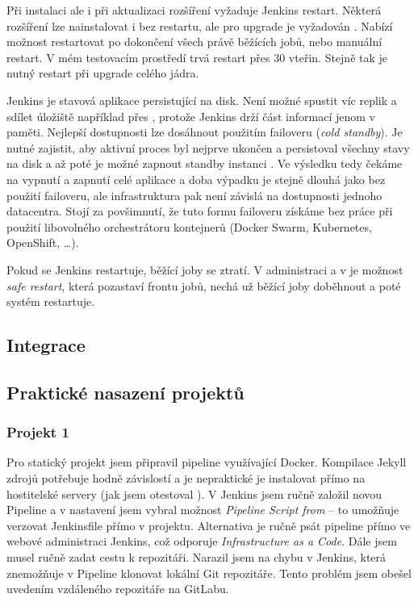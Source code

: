         Při instalaci ale i při aktualizaci rozšíření vyžaduje Jenkins restart. Některá rozšíření lze nainstalovat i bez restartu, ale pro upgrade je vyžadován \cite{jenkins-norestart}. Nabízí možnost restartovat po dokončení všech právě běžících jobů, nebo manuální restart. V mém testovacím prostředí trvá restart přes 30 vteřin. Stejně tak je nutný restart při upgrade celého jádra.

        Jenkins je stavová aplikace persistující na disk. Není možné spustit víc replik a sdílet úložiště například přes , protože Jenkins drží část informací jenom v paměti. Nejlepší dostupnosti lze dosáhnout použitím failoveru (\textit{cold standby}). Je nutné zajistit, aby aktivní proces byl nejprve ukončen a persistoval všechny stavy na disk a až poté je možné zapnout standby instanci \cite{jenkins-ha}. Ve výsledku tedy čekáme na vypnutí a zapnutí celé aplikace a doba výpadku je stejně dlouhá jako bez použití failoveru, ale infrastruktura pak není závislá na dostupnosti jednoho datacentra. Stojí za povšimnutí, že tuto formu failoveru získáme bez práce při použití libovolného orchestrátoru kontejnerů (Docker Swarm, Kubernetes, OpenShift, \ldots).

        Pokud se Jenkins restartuje, běžící joby se ztratí.  V administraci a v  je možnost \textit{safe restart}, která pozastaví frontu jobů, nechá už běžící joby doběhnout a poté systém restartuje. 

    \subsection{Integrace}
        \blind[2]
        \blind[5]

    \subsection{Praktické nasazení projektů}
        \subsubsection{Projekt 1}
            Pro statický projekt jsem připravil pipeline využívající Docker. Kompilace Jekyll zdrojů potřebuje hodně závislostí a je nepraktické je instalovat přímo na hostitelské servery (jak jsem otestoval ). V Jenkins jsem ručně založil novou Pipeline a v nastavení jsem vybral možnost \textit{Pipeline Script from } -- to umožňuje verzovat Jenkinsfile přímo v projektu. Alternativa je ručně psát pipeline přímo ve webové administraci Jenkins, což odporuje \textit{Infrastructure as a Code}. Dále jsem musel ručně zadat cestu k repozitáři. Narazil jsem na chybu v Jenkins, která znemožňuje v Pipeline klonovat lokální Git repozitáře. Tento problém jsem obešel uvedením vzdáleného repozitáře na GitLabu.

